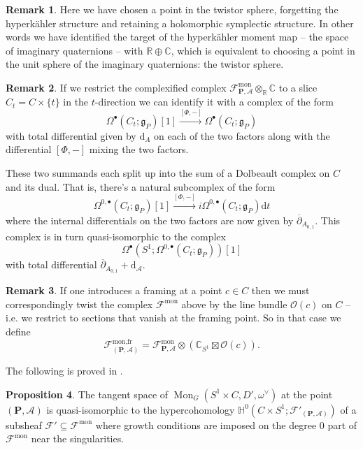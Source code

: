 \documentclass[11pt, oneside, reqno]{amsart}
\theoremstyle{definition} \newtheorem{definition}{Definition}[section]
\newtheorem{prop}[definition]{Proposition}
\theoremstyle{definition} \newtheorem{remark}[definition]{Remark}
\theoremstyle{definition} \newtheorem{remarks}[definition]{Remarks}
\theoremstyle{definition} \newtheorem{question}[definition]{Question}
\theoremstyle{definition} \newtheorem*{note}{Note}
\theoremstyle{definition} \newtheorem{example}[definition]{Example}
\theoremstyle{definition} \newtheorem{examples}[definition]{Examples}
\renewcommand{\gg}{\mathfrak{g}}
\newcommand{\bb}[1]{\mathbb{#1}}
\newcommand{\mr}[1]{\mathrm{#1}}
\newcommand{\mc}[1]{\mathcal{#1}}
\newcommand{\bo}[1]{\boldsymbol{#1}}
\newcommand{\dd}{\partial}
\newcommand{\ol}[1]{\overline{#1}}
\newcommand{\CC}{\mathbb{C}}
\newcommand{\RR}{\mathbb{R}}
\newcommand{\OO}{\mathcal{O}}
\newcommand{\sub}{\subseteq}
\DeclareMathOperator{\mon}{Mon}
\renewcommand{\d}{\mathrm{d}}
\begin{document}
\begin{remark}
Here we have chosen a point in the twistor sphere, forgetting the hyperk\"ahler structure and retaining a holomorphic symplectic structure.  In other words we have identified the target of the hyperk\"ahler moment map -- the space of imaginary quaternions -- with $\RR \oplus \CC$, which is equivalent to choosing a point in the unit sphere of the imaginary quaternions: the twistor sphere.  
\end{remark}

\begin{remark} \label{monopole_holo_restriction_rmk}
If we restrict the complexified complex $\mc F^{\mr{mon}}_{\bo P, \mc A} \otimes_\RR \CC$ to a slice $C_t = C \times \{t\}$ in the $t$-direction we can identify it with a complex of the form
\[\Omega^\bullet(C_t; \gg_P)[1] \overset {[\Phi,-]} \to \Omega^\bullet(C_t; \gg_P)\]
with total differential given by $\d_A$ on each of the two factors along with the differential $[\Phi,-]$ mixing the two factors. 

These two summands each split up into the sum of a Dolbeault complex on $C$ and its dual.  That is, there's a natural subcomplex of the form
\[\Omega^{0,\bullet}(C_t; \gg_P)[1] \overset {[\Phi,-]} \to i \Omega^{0,\bullet}(C_t; \gg_P) \d t\]
where the internal differentials on the two factors are now given by $\ol \dd_{A_{0,1}}$.  This complex is in turn quasi-isomorphic to the complex
\[\Omega^\bullet(S^1; \Omega^{0,\bullet}(C_t;\gg_P))[1]\]
with total differential $\ol \dd_{A_{0,1}} + \d_{\mc A}$.
\end{remark}

\begin{remark}
If one introduces a framing at a point $c \in C$ then we must correspondingly twist the complex $\mc F^{\mr{mon}}$ above by the line bundle $\OO(c)$ on $C$ -- i.e. we restrict to sections that vanish at the framing point.  So in that case we define
\[\mc F^{\text{mon,fr}}_{(\bo P,\mc A)} = \mc F^{\mr{mon}}_{\bo P, \mc A} \otimes (\CC_{S^1} \boxtimes \OO(c)).\]
\end{remark}

The following is proved in \cite{FoscoloDef}.
\begin{prop}
The tangent space of $\mon_G(S^1 \times C, D', \omega^\vee)$ at the point $(\bo P,\mc A)$ is quasi-isomorphic to the hypercohomology $\bb H^0(C \times S^1; \mc F'_{(\bo P,\mc A)})$ of a subsheaf $\mc F' \sub \mc F^{\mr{mon}}$ where growth conditions are imposed on the degree 0 part of $\mc F^{\mr{mon}}$ near the singularities.
\end{prop}
  
\end{document}
